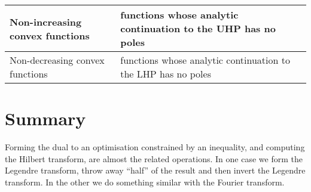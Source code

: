 \documentclass[10pt]{article}
\begin{document}
\begin{tabular}{| l | l |}
\hline

Non-increasing convex functions & functions whose analytic continuation to the UHP has no poles \\

\hline

Non-decreasing convex functions & functions whose analytic continuation to the LHP has no poles \\

\hline
\end{tabular}

\section{Summary}
Forming the dual to an optimisation constrained by an inequality, and computing the Hilbert transform, are almost the related operations.
In one case we form the Legendre transform, throw away ``half'' of the result and then invert the Legendre transform.
In the other we do something similar with the Fourier transform.



\end{document}
